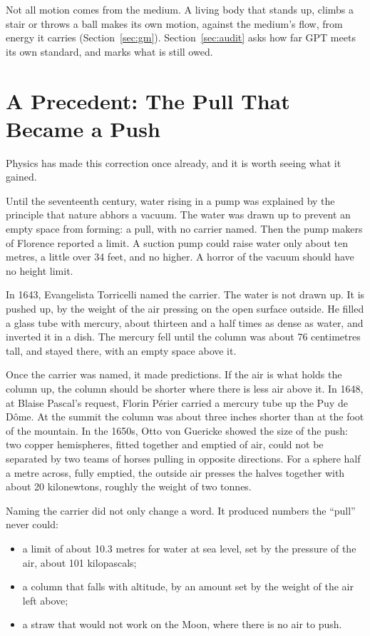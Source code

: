 \documentclass[11pt,a4paper]{article}
\begin{document}
 Not all motion comes from the medium. A living body that stands up, climbs a stair or throws a ball makes its own motion, against the medium's flow, from energy it carries (Section~\ref{sec:gm}). Section~\ref{sec:audit} asks how far GPT meets its own standard, and marks what is still owed.

\section{A Precedent: The Pull That Became a Push}
\label{sec:precedent}

Physics has made this correction once already, and it is worth seeing what it gained.

Until the seventeenth century, water rising in a pump was explained by the principle that nature abhors a vacuum. The water was drawn up to prevent an empty space from forming: a pull, with no carrier named. Then the pump makers of Florence reported a limit. A suction pump could raise water only about ten metres, a little over 34 feet, and no higher. A horror of the vacuum should have no height limit.

In 1643, Evangelista Torricelli named the carrier. The water is not drawn up. It is pushed up, by the weight of the air pressing on the open surface outside. He filled a glass tube with mercury, about thirteen and a half times as dense as water, and inverted it in a dish. The mercury fell until the column was about 76 centimetres tall, and stayed there, with an empty space above it.

Once the carrier was named, it made predictions. If the air is what holds the column up, the column should be shorter where there is less air above it. In 1648, at Blaise Pascal's request, Florin P\'erier carried a mercury tube up the Puy de D\^ome. At the summit the column was about three inches shorter than at the foot of the mountain. In the 1650s, Otto von Guericke showed the size of the push: two copper hemispheres, fitted together and emptied of air, could not be separated by two teams of horses pulling in opposite directions. For a sphere half a metre across, fully emptied, the outside air presses the halves together with about 20 kilonewtons, roughly the weight of two tonnes.

Naming the carrier did not only change a word. It produced numbers the ``pull'' never could:
\begin{itemize}
  \item a limit of about 10.3 metres for water at sea level, set by the pressure of the air, about 101 kilopascals;
  \item a column that falls with altitude, by an amount set by the weight of the air left above;
  \item a straw that would not work on the Moon, where there is no air to push.
\end{itemize}
\end{document}
